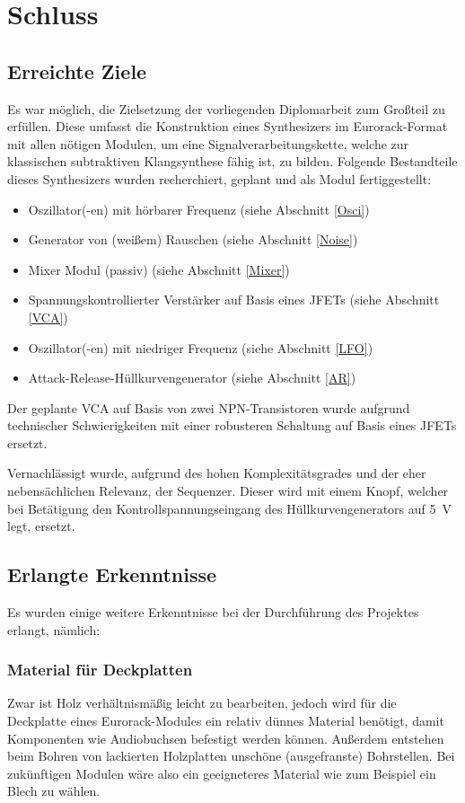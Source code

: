 \chapter{Schluss}

\section{Erreichte Ziele \label{goals}}
\label{sec:org5e00ea6}
Es war möglich, die Zielsetzung der vorliegenden Diplomarbeit zum Großteil zu erfüllen. Diese umfasst die Konstruktion eines Synthesizers im Eurorack-Format mit allen nötigen Modulen, um eine Signalverarbeitungskette, welche zur klassischen subtraktiven Klangsynthese fähig ist, zu bilden. Folgende Bestandteile dieses Synthesizers wurden recherchiert, geplant und als Modul fertiggestellt:

\begin{itemize}
\item Oszillator(-en) mit hörbarer Frequenz (siehe Abschnitt \ref{Osci})
\item Generator von (weißem) Rauschen (siehe Abschnitt \ref{Noise})
\item Mixer Modul (passiv) (siehe Abschnitt \ref{Mixer})
\item Spannungskontrollierter Verstärker auf Basis eines JFETs (siehe Abschnitt \ref{VCA})
\item Oszillator(-en) mit niedriger Frequenz (siehe Abschnitt \ref{LFO})
\item Attack-Release-Hüllkurvengenerator (siehe Abschnitt \ref{AR})
\end{itemize}

Der geplante \ac{VCA} auf Basis von zwei NPN-Transistoren wurde aufgrund technischer Schwierigkeiten mit einer robusteren Schaltung auf Basis eines JFETs ersetzt.

Vernachlässigt wurde, aufgrund des hohen Komplexitätsgrades und der eher nebensächlichen Relevanz, der Sequenzer. Dieser wird mit einem Knopf, welcher bei Betätigung den Kontrollspannungseingang des Hüllkurvengenerators auf \SI{5}{\volt} legt, ersetzt.

\section{Erlangte Erkenntnisse}
\label{sec:org946979a}
Es wurden einige weitere Erkenntnisse bei der Durchführung des Projektes erlangt, nämlich:

\subsection{Material für Deckplatten}
\label{sec:org29dbdf3}
Zwar ist Holz verhältnismäßig leicht zu bearbeiten, jedoch wird für die Deckplatte eines Eurorack-Modules ein relativ dünnes Material benötigt, damit Komponenten wie Audiobuchsen befestigt werden können. Außerdem entstehen beim Bohren von lackierten Holzplatten unschöne (ausgefranste) Bohrstellen. Bei zukünftigen Modulen wäre also ein geeigneteres Material wie zum Beispiel ein Blech zu wählen.

